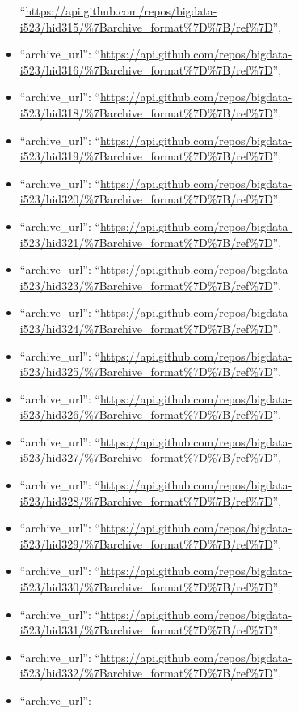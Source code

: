 \begin{itemize}
  ``\url{https://api.github.com/repos/bigdata-i523/hid315/\%7Barchive_format\%7D\%7B/ref\%7D}'',
\item
  ``archive\_url'':
  ``\url{https://api.github.com/repos/bigdata-i523/hid316/\%7Barchive_format\%7D\%7B/ref\%7D}'',
\item
  ``archive\_url'':
  ``\url{https://api.github.com/repos/bigdata-i523/hid318/\%7Barchive_format\%7D\%7B/ref\%7D}'',
\item
  ``archive\_url'':
  ``\url{https://api.github.com/repos/bigdata-i523/hid319/\%7Barchive_format\%7D\%7B/ref\%7D}'',
\item
  ``archive\_url'':
  ``\url{https://api.github.com/repos/bigdata-i523/hid320/\%7Barchive_format\%7D\%7B/ref\%7D}'',
\item
  ``archive\_url'':
  ``\url{https://api.github.com/repos/bigdata-i523/hid321/\%7Barchive_format\%7D\%7B/ref\%7D}'',
\item
  ``archive\_url'':
  ``\url{https://api.github.com/repos/bigdata-i523/hid323/\%7Barchive_format\%7D\%7B/ref\%7D}'',
\item
  ``archive\_url'':
  ``\url{https://api.github.com/repos/bigdata-i523/hid324/\%7Barchive_format\%7D\%7B/ref\%7D}'',
\item
  ``archive\_url'':
  ``\url{https://api.github.com/repos/bigdata-i523/hid325/\%7Barchive_format\%7D\%7B/ref\%7D}'',
\item
  ``archive\_url'':
  ``\url{https://api.github.com/repos/bigdata-i523/hid326/\%7Barchive_format\%7D\%7B/ref\%7D}'',
\item
  ``archive\_url'':
  ``\url{https://api.github.com/repos/bigdata-i523/hid327/\%7Barchive_format\%7D\%7B/ref\%7D}'',
\item
  ``archive\_url'':
  ``\url{https://api.github.com/repos/bigdata-i523/hid328/\%7Barchive_format\%7D\%7B/ref\%7D}'',
\item
  ``archive\_url'':
  ``\url{https://api.github.com/repos/bigdata-i523/hid329/\%7Barchive_format\%7D\%7B/ref\%7D}'',
\item
  ``archive\_url'':
  ``\url{https://api.github.com/repos/bigdata-i523/hid330/\%7Barchive_format\%7D\%7B/ref\%7D}'',
\item
  ``archive\_url'':
  ``\url{https://api.github.com/repos/bigdata-i523/hid331/\%7Barchive_format\%7D\%7B/ref\%7D}'',
\item
  ``archive\_url'':
  ``\url{https://api.github.com/repos/bigdata-i523/hid332/\%7Barchive_format\%7D\%7B/ref\%7D}'',
\item
  ``archive\_url'':

\end{itemize}
